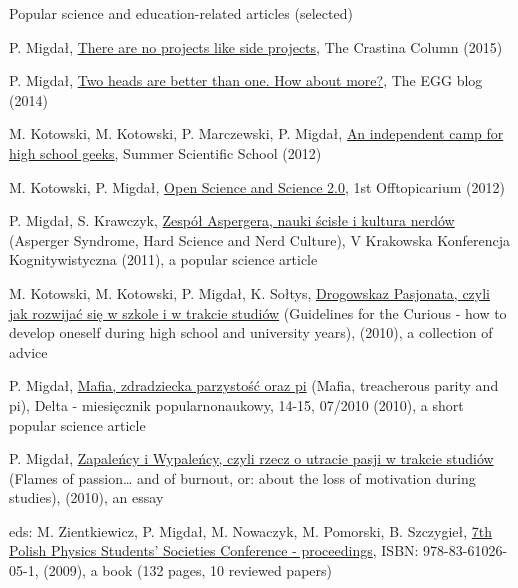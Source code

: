 \documentclass[margin,line]{resume}
\begin{document}
\begin{resume}
    Popular science and education-related articles (selected)
    \begin{list2}
        \item P. Migdał, \href{http://crastina.se/theres-no-projects-like-side-projects/}{There are no projects like side projects}, The Crastina Column (2015)
        \item P. Migdał, \href{http://egtheory.wordpress.com/2014/01/30/two-heads-are-better-than-one-how-about-more/}{Two heads are better than one. How about more?}, The EGG blog (2014)
        \item M. Kotowski, M. Kotowski, P. Marczewski, P. Migdał, \href{http://warsztatywww.wikidot.com/en:indie-camp-for-hs-geeks}{An independent camp for high school geeks}, Summer Scientific School (2012)
        \item M. Kotowski, P. Migdał, \href{http://offtopicarium.wikidot.com/v1:open-science-2-0}{Open Science and Science 2.0}, 1st Offtopicarium (2012)
        \item P. Migdał, S. Krawczyk, \href{http://migdal.wikidot.com/local--files/nerdowska-duma/Migdal_Krawczyk__Zespol_Aspergera_preprint_after_vkkk.pdf}{Zespół Aspergera, nauki ścisłe i kultura nerdów} (Asperger Syndrome, Hard Science and Nerd Culture), V Krakowska Konferencja Kognitywistyczna (2011), a popular science article
		\item M. Kotowski, M. Kotowski, P. Migdał, K. Sołtys, \href{http://warsztatywww.wikidot.com/drogowskaz-pasjonata}{Drogowskaz Pasjonata, czyli jak rozwijać się w szkole i w trakcie studiów} (Guidelines for the Curious - how to develop oneself during high school and university years), (2010), a collection of advice
		\item P. Migdał, \href{http://www.mimuw.edu.pl/delta/artykuly/delta2010-07/2010-07-6.pdf}{Mafia, zdradziecka parzystość oraz pi} (Mafia, treacherous parity and pi), Delta - miesięcznik popularnonaukowy, 14-15, 07/2010 (2010), a short popular science article
		\item P. Migdał, \href{http://migdal.wikidot.com/zapalency-i-wypalency}{Zapaleńcy i Wypaleńcy, czyli rzecz o utracie pasji w trakcie studiów} (Flames of passion… and of burnout, or: about the loss of motivation during studies), (2010), an essay
		\item eds: M. Zientkiewicz, P. Migdał, M. Nowaczyk, M. Pomorski, B. Szczygieł, \href{http://skfiz.fuw.edu.pl/vii-osknf:proceedings}{7th Polish Physics Students' Societies Conference - proceedings}, ISBN: 978-83-61026-05-1, (2009), a book (132 pages, 10 reviewed papers)
    \end{list2}




\end{resume}
\end{document}

